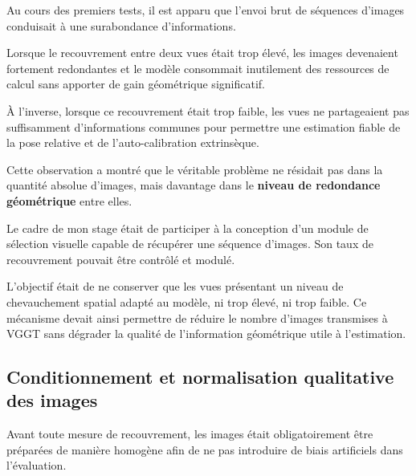 \documentclass[12pt,a4paper,oneside]{report}
\begin{document}
\hspace*{1cm}Au cours des premiers tests, il est apparu que l'envoi brut de séquences d'images conduisait à une surabondance d'informations. \vspace{0.1cm}

\hspace*{0.5cm}Lorsque le recouvrement entre deux vues était trop élevé, les images devenaient fortement redondantes et le modèle consommait inutilement des ressources de calcul sans apporter de gain géométrique significatif. \vspace{0.5cm}

\hspace*{1cm}À l'inverse, lorsque ce recouvrement était trop faible, les vues ne partageaient pas suffisamment d'informations communes pour permettre une estimation fiable de la pose relative et de l'auto-calibration extrinsèque. \vspace{0.1cm}

\hspace*{0.5cm}Cette observation a montré que le véritable problème ne résidait pas dans la quantité absolue d'images, mais davantage dans le \textbf{niveau de redondance géométrique} entre elles.\vspace{0.1cm}

\hspace*{.5cm}Le cadre de mon stage était de participer à la conception d'un module de sélection visuelle capable de récupérer une séquence d'images. Son taux de recouvrement pouvait être contrôlé et modulé.\vspace{0.1cm}

\hspace*{.5cm}L'objectif était de ne conserver que les vues présentant un niveau de chevauchement spatial adapté au modèle, ni trop élevé, ni trop faible. Ce mécanisme devait ainsi permettre de réduire le nombre d'images transmises à VGGT sans dégrader la qualité de l'information géométrique utile à l'estimation.

\newpage

\subsection{Conditionnement et normalisation qualitative des images}

\hspace*{1cm}Avant toute mesure de recouvrement, les images était obligatoirement être préparées de manière homogène afin de ne pas introduire de biais artificiels dans l'évaluation. \vspace{0.05cm}
\end{document}
